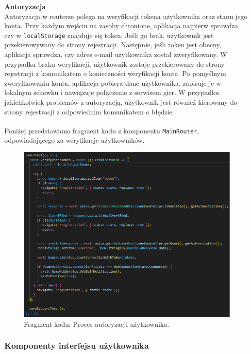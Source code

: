 \documentclass[twoside]{projektInzynierskiMS1}
\begin{document}
\newpage

\noindent \textbf{Autoryzacja}\\
Autoryzacja w routerze polega na weryfikacji tokena użytkownika oraz stanu jego konta. Przy każdym wejściu na zasoby chronione, aplikacja najpierw sprawdza, czy w \texttt{localStorage} znajduje się token. Jeśli go brak, użytkownik jest przekierowywany do strony rejestracji. Następnie, jeśli token jest obecny, aplikacja sprawdza, czy adres e-mail użytkownika został zweryfikowany. W przypadku braku weryfikacji, użytkownik zostaje przekierowany do strony rejestracji z komunikatem o konieczności weryfikacji konta. Po pomyślnym zweryfikowaniu konta, aplikacja pobiera dane użytkownika, zapisuje je w lokalnym schowku i nawiązuje połączenie z serwisem gier. W przypadku jakichkolwiek problemów z autoryzacją, użytkownik jest również kierowany do strony rejestracji z odpowiednim komunikatem o błędzie.
\\\\
Poniżej przedstawiono fragment kodu z komponentu \texttt{MainRouter}, odpowiadającego za weryfikacje użytkowników.

\vspace{0.5cm}
\begin{figure}[h!]
    \centering
    \includegraphics[width=1\textwidth]{images/ex_router_authorization.png}
    \caption{Fragment kodu: Proces autoryzacji użytkownika.}
\end{figure}

\newpage

\subsubsection{Komponenty interfejsu użytkownika}
\end{document}
